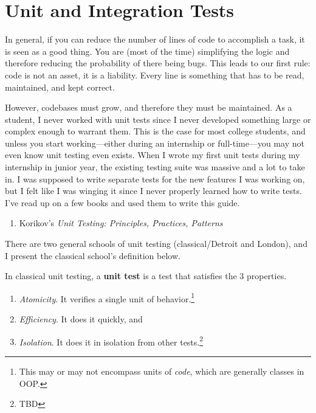 \section{Unit and Integration Tests} 

  In general, if you can reduce the number of lines of code to accomplish a task, it is seen as a good thing. You are (most of the time) simplifying the logic and therefore reducing the probability of there being bugs. This leads to our first rule: code is not an asset, it is a liability. Every line is something that has to be read, maintained, and kept correct.

  However, codebases must grow, and therefore they must be maintained. As a student, I never worked with unit tests since I never developed something large or complex enough to warrant them. This is the case for most college students, and unless you start working---either during an internship or full-time---you may not even know unit testing even exists. When I wrote my first unit tests during my internship in junior year, the existing testing suite was massive and a lot to take in. I was supposed to write separate tests for the new features I was working on, but I felt like I was winging it since I never properly learned how to write tests. I've read up on a few books and used them to write this guide. 
  \begin{enumerate}
    \item Korikov's \textit{Unit Testing: Principles, Practices, Patterns}
  \end{enumerate} 

  There are two general schools of unit testing (classical/Detroit and London), and I present the classical school's definition below. 

  \begin{definition}
    \label{def:unit-test}
    In classical unit testing, a \textbf{unit test} is a test that satisfies the 3 properties. 
    \begin{enumerate}
      \item \textit{Atomicity}. It verifies a single unit of behavior.\footnote{This may or may not encompass units of \textit{code}, which are generally classes in OOP. }
      \item \textit{Efficiency}. It does it quickly, and 
      \item \textit{Isolation}. It does it in isolation from other tests.\footnote{TBD}
    \end{enumerate}
  \end{definition}

